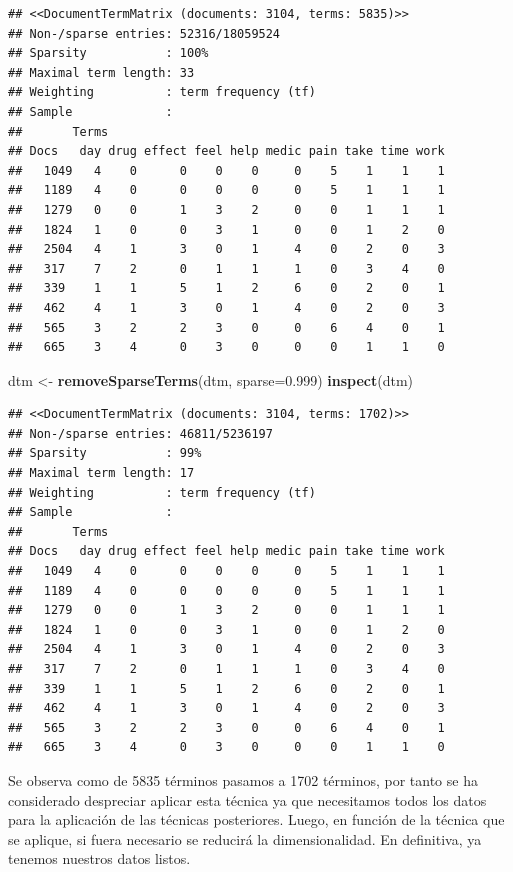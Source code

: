 \documentclass[spanish,]{article}
\newenvironment{Shaded}{\begin{snugshade}}{\end{snugshade}}
\newcommand{\KeywordTok}[1]{\textcolor[rgb]{0.13,0.29,0.53}{\textbf{#1}}}
\newcommand{\DataTypeTok}[1]{\textcolor[rgb]{0.13,0.29,0.53}{#1}}
\newcommand{\FloatTok}[1]{\textcolor[rgb]{0.00,0.00,0.81}{#1}}
\newcommand{\StringTok}[1]{\textcolor[rgb]{0.31,0.60,0.02}{#1}}
\newcommand{\NormalTok}[1]{#1}
\begin{document}
\begin{verbatim}
## <<DocumentTermMatrix (documents: 3104, terms: 5835)>>
## Non-/sparse entries: 52316/18059524
## Sparsity           : 100%
## Maximal term length: 33
## Weighting          : term frequency (tf)
## Sample             :
##       Terms
## Docs   day drug effect feel help medic pain take time work
##   1049   4    0      0    0    0     0    5    1    1    1
##   1189   4    0      0    0    0     0    5    1    1    1
##   1279   0    0      1    3    2     0    0    1    1    1
##   1824   1    0      0    3    1     0    0    1    2    0
##   2504   4    1      3    0    1     4    0    2    0    3
##   317    7    2      0    1    1     1    0    3    4    0
##   339    1    1      5    1    2     6    0    2    0    1
##   462    4    1      3    0    1     4    0    2    0    3
##   565    3    2      2    3    0     0    6    4    0    1
##   665    3    4      0    3    0     0    0    1    1    0
\end{verbatim}

\begin{Shaded}
\begin{Highlighting}[]
\NormalTok{dtm <-}\StringTok{ }\KeywordTok{removeSparseTerms}\NormalTok{(dtm, }\DataTypeTok{sparse=}\FloatTok{0.999}\NormalTok{)}
\KeywordTok{inspect}\NormalTok{(dtm)}
\end{Highlighting}
\end{Shaded}

\begin{verbatim}
## <<DocumentTermMatrix (documents: 3104, terms: 1702)>>
## Non-/sparse entries: 46811/5236197
## Sparsity           : 99%
## Maximal term length: 17
## Weighting          : term frequency (tf)
## Sample             :
##       Terms
## Docs   day drug effect feel help medic pain take time work
##   1049   4    0      0    0    0     0    5    1    1    1
##   1189   4    0      0    0    0     0    5    1    1    1
##   1279   0    0      1    3    2     0    0    1    1    1
##   1824   1    0      0    3    1     0    0    1    2    0
##   2504   4    1      3    0    1     4    0    2    0    3
##   317    7    2      0    1    1     1    0    3    4    0
##   339    1    1      5    1    2     6    0    2    0    1
##   462    4    1      3    0    1     4    0    2    0    3
##   565    3    2      2    3    0     0    6    4    0    1
##   665    3    4      0    3    0     0    0    1    1    0
\end{verbatim}

Se observa como de 5835 términos pasamos a 1702 términos, por tanto se
ha considerado despreciar aplicar esta técnica ya que necesitamos todos
los datos para la aplicación de las técnicas posteriores. Luego, en
función de la técnica que se aplique, si fuera necesario se reducirá la
dimensionalidad. En definitiva, ya tenemos nuestros datos listos.
\end{document}
